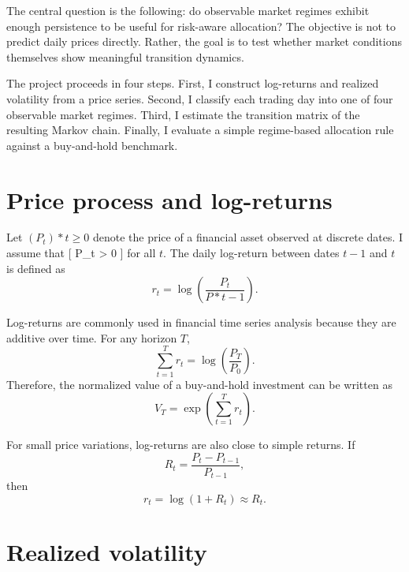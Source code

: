 \documentclass[11pt,a4paper]{article}
\begin{document}
The central question is the following: do observable market regimes exhibit enough persistence to be useful for risk-aware allocation? The objective is not to predict daily prices directly. Rather, the goal is to test whether market conditions themselves show meaningful transition dynamics.

The project proceeds in four steps. First, I construct log-returns and realized volatility from a price series. Second, I classify each trading day into one of four observable market regimes. Third, I estimate the transition matrix of the resulting Markov chain. Finally, I evaluate a simple regime-based allocation rule against a buy-and-hold benchmark.

\section{Price process and log-returns}

Let $(P_t)*{t \geq 0}$ denote the price of a financial asset observed at discrete dates. I assume that
[
P_t > 0
]
for all $t$. The daily log-return between dates $t-1$ and $t$ is defined as
\begin{equation}
r_t = \log\left(\frac{P_t}{P*{t-1}}\right).
\end{equation}

Log-returns are commonly used in financial time series analysis because they are additive over time. For any horizon $T$,
\begin{equation}
\sum_{t=1}^{T} r_t
=
\log\left(\frac{P_T}{P_0}\right).
\end{equation}
Therefore, the normalized value of a buy-and-hold investment can be written as
\begin{equation}
V_T
=
\exp\left(\sum_{t=1}^{T} r_t\right).
\end{equation}

For small price variations, log-returns are also close to simple returns. If
\begin{equation}
R_t = \frac{P_t-P_{t-1}}{P_{t-1}},
\end{equation}
then
\begin{equation}
r_t = \log(1+R_t) \approx R_t.
\end{equation}

\section{Realized volatility}
\end{document}
